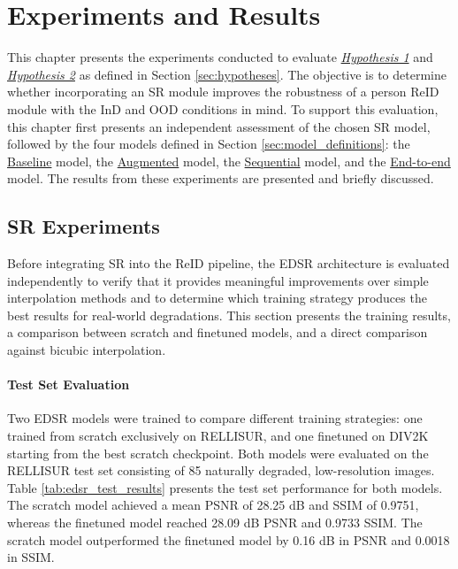 \chapter{Experiments and Results} \label{cha: experiments and results}
 This chapter presents the experiments conducted to evaluate \hyperlink{hypothesis:1}{\textit{Hypothesis 1}} and \hyperlink{hypothesis:2}{\textit{Hypothesis 2}} as defined in Section \ref{sec:hypotheses}. The objective is to determine whether incorporating an \acs{SR} module improves the robustness of a person \acs{ReID} module with the \acs{InD} and \acs{OOD} conditions in mind. To support this evaluation, this chapter first presents an independent assessment of the chosen \acs{SR} model, followed by the four models defined in Section \ref{sec:model_definitions}: the \hyperlink{model:baseline}{Baseline} model, the \hyperlink{model:augmented}{Augmented} model, the \hyperlink{model:sequential}{Sequential} model, and the \hyperlink{model:endtoend}{End-to-end} model. The results from these experiments are presented and briefly discussed. 

\section{SR Experiments} \label{sec: srexperiments}
Before integrating \acs{SR} into the \acs{ReID} pipeline, the \acs{EDSR} architecture is evaluated independently to verify that it provides meaningful improvements over simple interpolation methods and to determine which training strategy produces the best results for real-world degradations. This section presents the training results, a comparison between scratch and finetuned models, and a direct comparison against bicubic interpolation.

\subsubsection{Test Set Evaluation}
Two \acs{EDSR} models were trained to compare different training strategies: one trained from scratch exclusively on \acs{RELLISUR}, and one finetuned on \acs{DIV2K} starting from the best scratch checkpoint. Both models were evaluated on the \acs{RELLISUR} test set consisting of 85 naturally degraded, low-resolution images. Table \ref{tab:edsr_test_results} presents the test set performance for both models. The scratch model achieved a mean \acs{PSNR} of 28.25 dB and \acs{SSIM} of 0.9751, whereas the finetuned model reached 28.09 dB \acs{PSNR} and 0.9733 \acs{SSIM}. The scratch model outperformed the finetuned model by 0.16 dB in \acs{PSNR} and 0.0018 in \acs{SSIM}.

